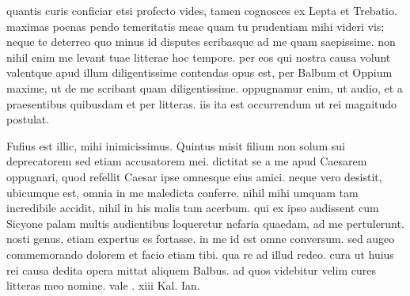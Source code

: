 


 quantis curis conficiar etsi profecto vides, tamen cognosces ex Lepta et Trebatio. maximas poenas pendo temeritatis meae quam tu prudentiam mihi videri vis; neque te deterreo quo minus id disputes scribasque ad me quam saepissime. non nihil enim me levant tuae litterae hoc tempore. per eos qui nostra causa volunt valentque apud illum diligentissime contendas opus est, per Balbum et Oppium maxime, ut de me scribant quam diligentissime. oppugnamur enim, ut audio, et a praesentibus quibusdam et per litteras. iis ita est occurrendum ut rei magnitudo postulat.

 Fufius est illic, mihi inimicissimus. Quintus misit filium non solum sui deprecatorem sed etiam accusatorem mei. dictitat se a me apud Caesarem oppugnari, quod refellit Caesar ipse omnesque eius amici. neque vero desistit, ubicumque est, omnia in me maledicta conferre. nihil mihi umquam tam incredibile accidit, nihil in his malis tam acerbum. qui ex ipso audissent cum Sicyone palam multis audientibus loqueretur nefaria quaedam, ad me pertulerunt. nosti genus, etiam expertus es fortasse. in me id est omne conversum. sed augeo commemorando dolorem et facio etiam tibi. qua re ad illud redeo. cura ut huius rei causa dedita opera mittat aliquem Balbus. ad quos videbitur velim cures litteras meo nomine. vale . xiii Kal. Ian.
